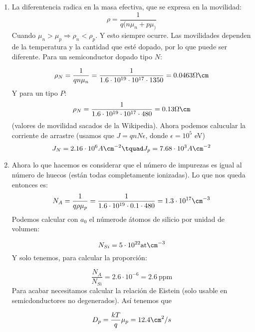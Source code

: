 	\begin{enumerate}[label=\alph*)]
		\item La diferentencia radica en la masa efectiva, que se expresa en la movilidad:
		\begin{equation}
			\rho = \frac{1}{q(n\mu_n + p \mu_)}
		\end{equation}
		Cuando $\mu_n>\mu_p \Rightarrow \rho_n < \rho_p$. Y esto siempre ocurre. Las movilidades dependen de la temperatura y la cantidad que esté dopado, por lo que puede ser diferente. Para un semiconductor dopado tipo $N$:

		\begin{equation}
			\rho_N = \frac{1}{qn{\mu_n}} = \frac{1}{1.6\cdot 10^{19} \cdot 10^{17}\cdot 1350}= 0.0463 \Omega \cm
		\end{equation}
		Y para un tipo $P$:
		\begin{equation}
			\rho_N = \frac{1}{1.6\cdot 10^{19} \cdot 10^{17}\cdot 480} = 0.13 \Omega \cm
		\end{equation}
		(valores de movilidad sacados de la Wikipedia). Ahora podemos calucular la corriente de arrastre (usamos que $J=qnN\epsilon$, donde $\epsilon = 10^5$ eV)
		\begin{equation}
			J_N =  2.16 \cdot 10^6  A\cm^{-2}  \tquad J_p = 7.68 \cdot 10^3  A\cm^{-2}
		\end{equation}
		\item Ahora lo que hacemos es considerar que el número de impurezas es igual al número de huecos (están todas completamente ionizadas). Lo que nos queda entonces es:
		\begin{equation}
			N_A = \frac{1}{q\rho \mu_p } = \frac{1}{1.6\cdot 10^{19} \cdot 0.1 \cdot 480} = 1.3 \cdot 10^{17} \cm^{-3}
		\end{equation}
		Podemos calcular con $a_0$ el númerode átomos de silicio por unidad de volumen:

		\begin{equation}
			N_{Si} = 5 \cdot 10^{22} \text{at} \cm^{-3}
		\end{equation}
		Y solo tenemos, para calcular la proporción:

		\begin{equation}
			\frac{N_A}{N_{Si}} = 2.6 \cdot 10^{-6} = 2.6 \ \text{ppm}
		\end{equation}
		Para acabar necesitamos calcular la relación de Eistein (solo usable en semicdonductores no degenerados). Así tenemos que

		\begin{equation}
			D_p = \frac{kT}{q} \mu_p = 12.4 \cm^2 / s
		\end{equation}
	\end{enumerate}
	
